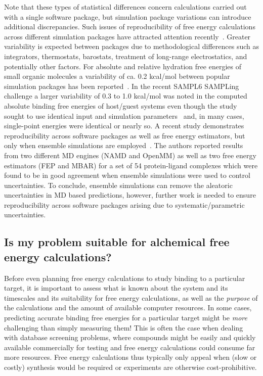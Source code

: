 \documentclass[9pt,bestpractices]{livecoms}
\begin{document}
Note that these types of statistical differences concern calculations carried out with a single software package, but simulation package variations can introduce additional discrepancies. Such issues of reproducibility of free energy calculations across different simulation packages have attracted attention recently~\cite{loeffler2018reproducibility,rizzi2019sampl6}. Greater variability is expected between packages due to methodological differences such as integrators, thermostats, barostats, treatment of long-range electrostatics, and potentially other factors. For absolute and relative hydration free energies of small organic molecules a variability of ca. 0.2 kcal/mol between popular simulation packages has been reported~\cite{loeffler2018reproducibility}. In the recent SAMPL6 SAMPLing challenge a larger variability of 0.3 to 1.0 kcal/mol was noted in the computed absolute binding free energies of host/guest systems even though the study sought to use identical input and simulation parameters~\cite{rizzi2019sampl6} and, in many cases, single-point energies were identical or nearly so. 
A recent study demonstrates reproducibility across software packages as well as free energy estimators, but only when ensemble simulations are employed~\cite{wade2022}. The authors reported results from two different MD engines (NAMD and OpenMM) as well as two free energy estimators (FEP and MBAR) for a set of 54 protein-ligand complexes which were found to be in good agreement when ensemble simulations were used to control uncertainties. To conclude, ensemble simulations can remove the aleatoric uncertainties in MD based predictions, however, further work is needed to ensure reproducibility across software packages arising due to systematic/parametric uncertainties.

\subsection{Is my problem suitable for alchemical free energy calculations?}
\label{subsec:suitability}
Before even planning free energy calculations to study binding to a
particular target, it is important to assess what is known about the
system and its timescales and its suitability for free energy
calculations, as well as the \emph{purpose} of the calculations and
the amount of available computer resources. In some cases, predicting accurate binding free energies for a particular target might be
\emph{more} challenging than simply measuring them! This is
often the case when dealing with database screening problems, where
compounds might be easily and quickly available commercially for
testing and free energy calculations could consume far more resources. Free energy calculations thus typically only
appeal when (slow or costly) synthesis would be required or experiments are otherwise cost-prohibitive.
\end{document}
